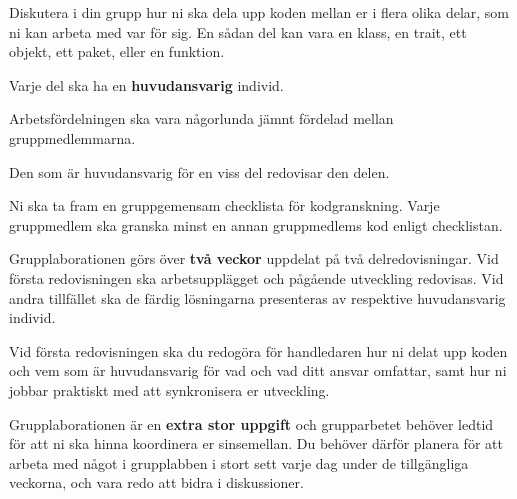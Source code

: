 \item
Diskutera i din grupp hur ni ska dela upp koden mellan er i flera olika delar, som ni kan arbeta med var för sig. En sådan del kan vara en klass, en trait, ett objekt, ett paket, eller en funktion.
\item
Varje del ska ha en \textbf{huvudansvarig} individ.
\item
Arbetsfördelningen ska vara någorlunda jämnt fördelad mellan gruppmedlemmarna.
\item
Den som är huvudansvarig för en viss del redovisar den delen.
\item 
Ni ska ta fram en gruppgemensam checklista för kodgranskning. Varje gruppmedlem ska granska minst en annan gruppmedlems kod enligt checklistan. 
\item
Grupplaborationen görs över \textbf{två veckor} uppdelat på två delredovisningar. Vid första redovisningen ska arbetsupplägget och pågående utveckling redovisas. Vid andra tillfället ska de färdig lösningarna presenteras av respektive huvudansvarig individ.
\item
Vid första redovisningen ska du redogöra för handledaren hur ni delat upp koden och vem som är huvudansvarig för vad och vad ditt ansvar omfattar, samt hur ni jobbar praktiskt med att synkronisera er utveckling.
\item Grupplaborationen är en \textbf{extra stor uppgift} och grupparbetet behöver ledtid för att ni ska hinna koordinera er sinsemellan. Du behöver därför planera för att arbeta med något i grupplabben i stort sett varje dag under de tillgängliga veckorna, och vara redo att bidra i diskussioner.
